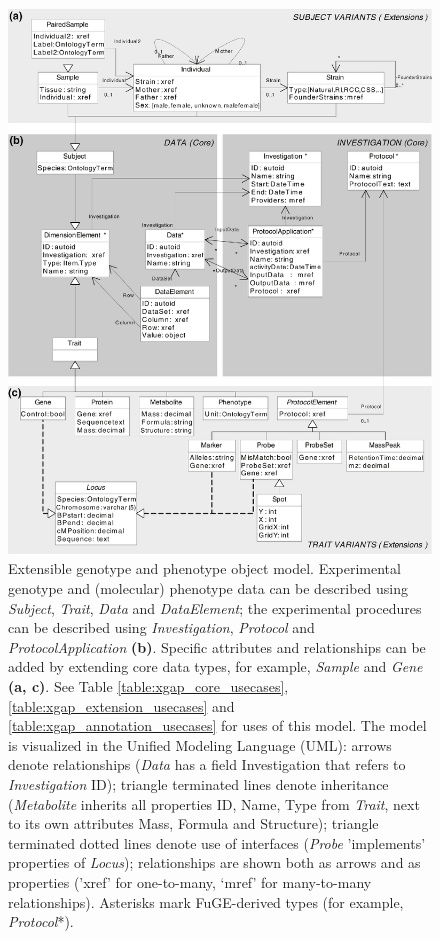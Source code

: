 \linespread{1.00} %
\begin{figure}
	\centering
	\includegraphics[width=0.87\linewidth]{img/xgap_model}
	\captionsetup{font=scriptsize,labelfont=scriptsize}
	\caption[Extensible genotype and phenotype object model]{Extensible genotype and phenotype object model. Experimental genotype and (molecular) phenotype data can be described using \textsl{Subject}, \textsl{Trait}, \textsl{Data} and \textsl{DataElement}; the experimental procedures can be described using \textsl{Investigation}, \textsl{Protocol} and \textsl{ProtocolApplication} \textbf{(b)}. Specific attributes and relationships can be added by extending core data types, for example, \textsl{Sample} and \textsl{Gene} \textbf{(a, c)}. See Table \ref{table:xgap_core_usecases}, \ref{table:xgap_extension_usecases} and \ref{table:xgap_annotation_usecases} for uses of this model. The model is visualized in the Unified Modeling Language (UML): arrows denote relationships (\textsl{Data} has a field Investigation that refers to \textsl{Investigation} ID); triangle terminated lines denote inheritance (\textsl{Metabolite} inherits all properties ID, Name, Type from \textsl{Trait}, next to its own attributes Mass, Formula and Structure); triangle terminated dotted lines denote use of interfaces (\textsl{Probe} ’implements’ properties of \textsl{Locus}); relationships are shown both as arrows and as properties (’xref’ for one-to-many, ‘mref’ for many-to-many relationships). Asterisks mark FuGE-derived types (for example, \textsl{Protocol}*).}
	\label{fig:xgap_model}
\end{figure}
\linespread{1.05} %

